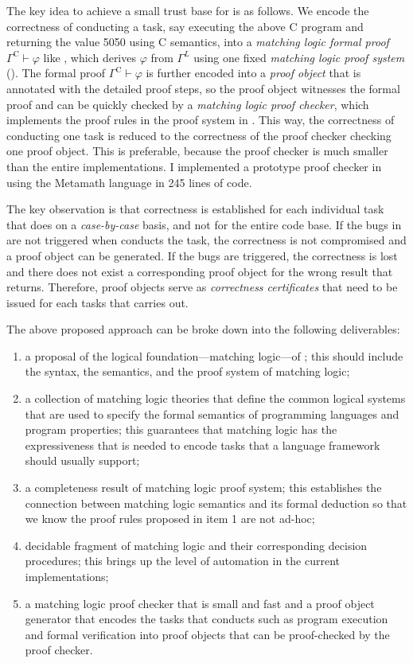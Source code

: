 \documentclass[11pt]{article}
\begin{document}
The key idea to achieve a small trust base for \K is as follows. 
We encode the correctness of \K conducting a task,
say executing the above C program  and returning the value 5050 using C semantics, 
into a \emph{matching logic formal proof}
$\Gamma^\textrm{C} \vdash \varphi$ like ,
which derives $\varphi$ from $\Gamma^L$ using one fixed 
\emph{matching logic proof system} (). 
The formal proof $\Gamma^\textrm{C} \vdash \varphi$ is further encoded into a 
\emph{proof object} that is annotated with the detailed proof steps,
so the proof object witnesses the formal proof
and can be quickly checked by a \emph{matching logic proof checker},
which implements the proof rules in the proof system in .
This way, the correctness of \K conducting one task is reduced to
the correctness of the proof checker checking one proof object.
This is preferable,
because the proof checker is much smaller than the 
entire \K implementations. 
I implemented a prototype proof checker in \cite{ml-checker} using the Metamath language \cite{metamath} in 245 lines of code.

The key observation is that
correctness is established for each individual task that \K does 
on a \emph{case-by-case} basis, and not for the entire \K code base. 
If the bugs in \K are not triggered when \K conducts the task, the correctness 
is not compromised and a proof object can be generated. 
If the bugs are triggered, the correctness is lost and there does 
not exist a corresponding proof object for the wrong result that \K 
returns.
Therefore, proof objects serve as \emph{correctness certificates}
that need to be issued for each tasks that \K carries out. 

The above proposed approach can be broke down into the following deliverables:
\begin{enumerate}
\item a proposal of the logical foundation---matching logic---of \K; this should include the syntax, the semantics, and the proof system of matching logic;
\item a collection of matching logic theories that define the common logical 
systems that are used to specify the formal semantics of programming 
languages and program properties; this guarantees that matching logic 
has the expressiveness that is needed to encode tasks that a language framework 
should usually support;
\item a completeness result of matching logic proof system;
this establishes the connection between matching logic semantics and its formal 
deduction so that we know the proof rules proposed in item 1 are not ad-hoc;
\item decidable fragment of matching logic and their corresponding decision procedures; this brings up the level of automation in the current \K implementations;
\item a matching logic proof checker that is small and fast and a proof object generator that encodes the tasks that \K conducts such as program execution and formal verification into proof objects that can be proof-checked by the proof checker.
\end{enumerate}
\end{document}
